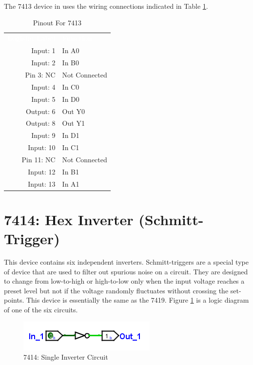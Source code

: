The 7413 device in \LE uses the wiring connections indicated in Table \ref{tab:50-7413}.

\begin{table}[H]
	\sffamily
	\newcommand{\head}[1]{\textcolor{white}{\textbf{#1}}}		
	\begin{center}
		\begin{tabular}{rl} 
			\rowcolor{black!75}
			\head{Logisim Label} & \head{Function} \\
			Input: 1    & In A0  \\
			Input: 2    & In B0  \\
			Pin 3: NC   & Not Connected \\
			Input: 4    & In C0  \\
			Input: 5    & In D0  \\
			Output: 6   & Out Y0 \\
			Output: 8   & Out Y1 \\
			Input: 9    & In D1  \\
			Input: 10   & In C1  \\
			Pin 11: NC  & Not Connected \\
			Input: 12   & In B1  \\
			Input: 13    & In A1  \\
		\end{tabular}
	\end{center}
	\caption{Pinout For 7413}
	\label{tab:50-7413}
\end{table}

\section{7414: Hex Inverter (Schmitt-Trigger)}

This device contains six independent inverters. Schmitt-triggers are a special type of device that are used to filter out spurious noise on a circuit. They are designed to change from low-to-high or high-to-low only when the input voltage reaches a preset level but not if the voltage randomly fluctuates without crossing the set-points. This device is essentially the same as the 7419. Figure \ref{fig:app_ttl-7414} is a logic diagram of one of the six circuits.

\begin{figure}[H]
	\centering
	\includegraphics{gfx/app_ttl-7404}
	\caption{7414: Single Inverter Circuit}
	\label{fig:app_ttl-7414}
\end{figure}

